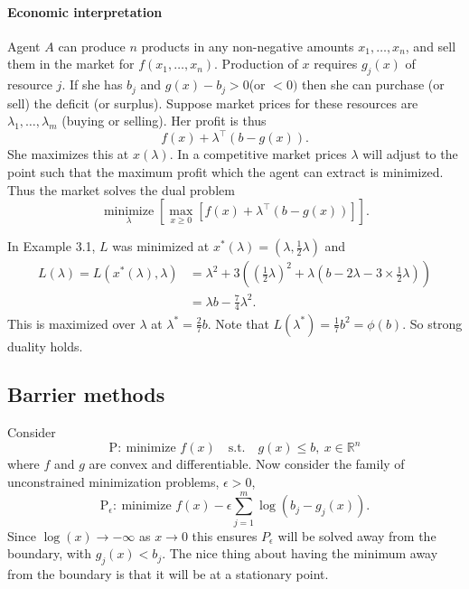 \paragraph{Economic interpretation} Agent $A$ can produce $n$ products in any non-negative amounts $x_1, \ldots, x_n$, and sell them in the market for $f\left(x_1, \ldots, x_n\right)$. Production of $x$ requires $g_j(x)$ of resource $j$. If she has $b_j$ and $g(x)-b_j>0$(or $<0)$ then she can purchase (or sell) the deficit (or surplus). Suppose market prices for these resources are $\lambda_1, \ldots, \lambda_m$ (buying or selling). Her profit is thus
\[
f(x)+\lambda^{\top}(b-g(x)) .
\]
She maximizes this at $x(\lambda)$. In a competitive market prices $ \lambda $ will adjust to the point such that the maximum profit which the agent can extract is minimized. Thus the market solves the dual problem
\[
\underset{\lambda}{\operatorname{minimize}} \left[ \max _{x \geq 0}\left[f(x)+\lambda^{\top}(b-g(x))\right] \right].
\]
\begin{example}
    In Example 3.1, $L$ was minimized at $x^*(\lambda)=\left(\lambda, \frac{1}{2} \lambda\right)$ and
    \[
    \begin{aligned}
    L(\lambda)=L\left(x^*(\lambda), \lambda\right) &=\lambda^2+3\left(\left(\frac{1}{2} \lambda\right)^2+\lambda\left(b-2 \lambda-3 \times \frac{1}{2} \lambda\right)\right)\\
    &=\lambda b-\frac{7}{4} \lambda^2 .
    \end{aligned}
    \]
    This is maximized over $\lambda$ at $\lambda^*=\frac{2}{7} b$. Note that $L\left(\lambda^*\right)=\frac{1}{7} b^2=\phi(b)$. So strong duality holds.
\end{example}

\subsection{Barrier methods}
Consider 
\[
    \mathrm{P}:\ \text{minimize } f(x)\quad \text{s.t.} \quad g(x)\le b,\ x\in \mathbb{R}^{n}
\]
where $f$ and $g$ are convex and differentiable. Now consider the family of unconstrained minimization problems, $\epsilon>0$,
\[
\mathrm{P}_\epsilon:\ \text{minimize } f(x)-\epsilon \sum_{j=1}^m \log \left(b_j-g_j(x)\right).
\]
Since $\log (x) \rightarrow-\infty$ as $x \rightarrow 0$ this ensures $P_\epsilon$ will be solved away from the boundary, with $g_j(x)<b_j$. The nice thing about having the minimum away from the boundary is that it will be at a stationary point.

